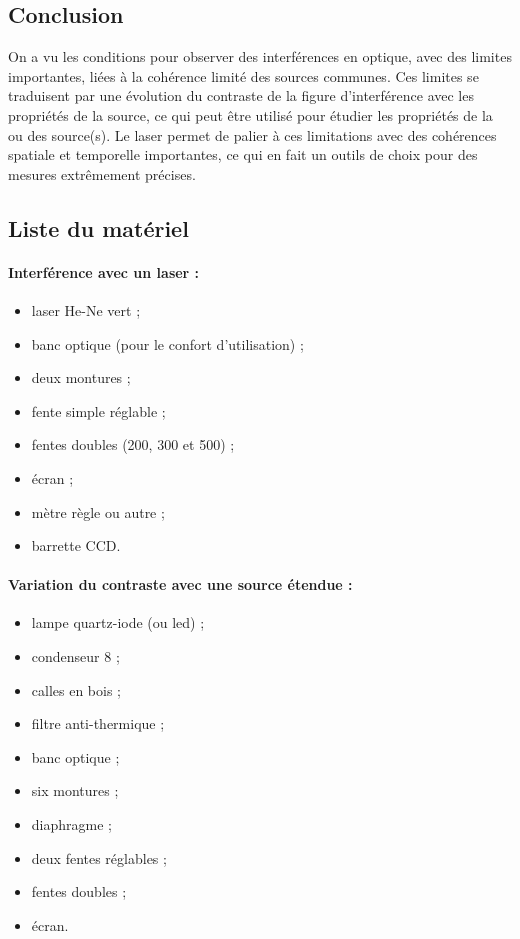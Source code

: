 \subsection{Conclusion}

On a vu les conditions pour observer des interférences en optique, avec des limites importantes, liées à la cohérence limité des sources communes.
Ces limites se traduisent par une évolution du contraste de la figure d'interférence avec les propriétés de la source, ce qui peut être utilisé pour étudier les propriétés de la ou des source(s).
Le laser permet de palier à ces limitations avec des cohérences spatiale et temporelle importantes, ce qui en fait un outils de choix pour des mesures extrêmement précises.

\subsection*{Liste du matériel}

\paragraph{Interférence avec un laser :}
\begin{itemize}
\item laser He-Ne vert ;
\item banc optique (pour le confort d'utilisation) ;
\item deux montures ;
\item fente simple réglable ;
\item fentes doubles (200, 300 et \unit{500}{\micro\meter}) ;
\item écran ;
\item mètre règle ou autre ;
\item barrette CCD.
\end{itemize}

\paragraph{Variation du contraste avec une source étendue :}
\begin{itemize}
\item lampe quartz-iode (ou led) ;
\item condenseur \unit{8}{\centi\meter} ;
\item calles en bois ;
\item filtre anti-thermique ;
\item banc optique ;
\item six montures ;
\item diaphragme ;
\item deux fentes réglables ;
\item fentes doubles ;
\item écran.
\end{itemize}